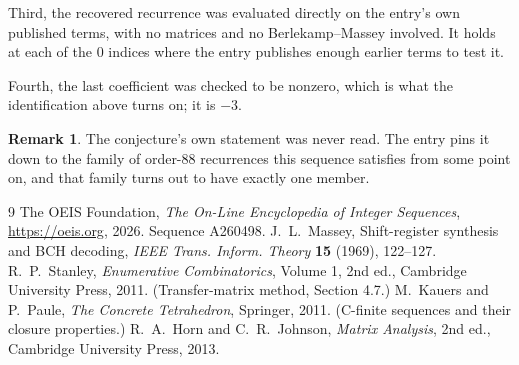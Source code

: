 \documentclass[11pt,a4paper]{article}
\theoremstyle{plain}
\theoremstyle{definition}
\newtheorem{remark}[theorem]{Remark}
\begin{document}
Third, the recovered recurrence was evaluated directly on the entry's own published terms, with
no matrices and no Berlekamp--Massey involved. It holds at each of the $0$ indices where
the entry publishes enough earlier terms to test it.

Fourth, the last coefficient was checked to be nonzero, which is what the identification above
turns on; it is $-3$.

\begin{remark}
The conjecture's own statement was never read. The entry pins it down to the family of
order-$88$ recurrences this sequence satisfies from some point on, and that family turns
out to have exactly one member.
\end{remark}

\begin{thebibliography}{9}
 The OEIS Foundation, \emph{The On-Line Encyclopedia of Integer
Sequences}, \url{https://oeis.org}, 2026. Sequence A260498.
 J.~L.~Massey, Shift-register synthesis and BCH decoding, \emph{IEEE
Trans. Inform. Theory} \textbf{15} (1969), 122--127.
 R.~P.~Stanley, \emph{Enumerative Combinatorics}, Volume 1, 2nd ed.,
Cambridge University Press, 2011. (Transfer-matrix method, Section 4.7.)
 M.~Kauers and P.~Paule, \emph{The Concrete Tetrahedron}, Springer, 2011.
(C-finite sequences and their closure properties.)
 R.~A.~Horn and C.~R.~Johnson, \emph{Matrix Analysis}, 2nd ed., Cambridge
University Press, 2013.
\end{thebibliography}
\end{document}
